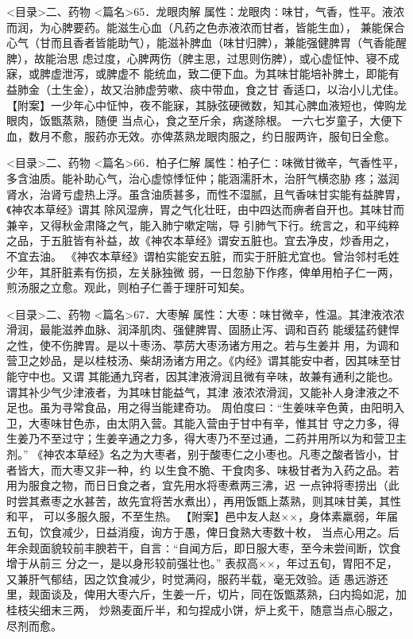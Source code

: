 \documentclass[a4paper,12pt,UTF8,twoside]{ctexbook}
\begin{document}
<目录>二、药物
<篇名>65．龙眼肉解
属性：龙眼肉∶味甘，气香，性平。液浓而润，为心脾要药。能滋生心血（凡药之色赤液浓而甘者，皆能生血）， 
兼能保合心气（甘而且香者皆能助气），能滋补脾血（味甘归脾），兼能强健脾胃（气香能醒脾），故能治思 
虑过度，心脾两伤（脾主思，过思则伤脾），或心虚怔忡、寝不成寐，或脾虚泄泻，或脾虚不 
能统血，致二便下血。为其味甘能培补脾土，即能有益肺金（土生金），故又治肺虚劳嗽、痰中带血，食之甘 
香适口，以治小儿尤佳。 
【附案】一少年心中怔忡，夜不能寐，其脉弦硬微数，知其心脾血液短也，俾购龙眼肉，饭甑蒸熟，随便 
当点心，食之至斤余，病遂除根。 
一六七岁童子，大便下血，数月不愈，服药亦无效。亦俾蒸熟龙眼肉服之，约日服两许，服旬日全愈。 

<目录>二、药物
<篇名>66．柏子仁解
属性：柏子仁∶味微甘微辛，气香性平，多含油质。能补助心气，治心虚惊悸怔仲；能涵濡肝木，治肝气横恣胁 
疼；滋润肾水，治肾亏虚热上浮。虽含油质甚多，而性不湿腻，且气香味甘实能有益脾胃，《神农本草经》谓其 
除风湿痹，胃之气化壮旺，由中四达而痹者自开也。其味甘而兼辛，又得秋金肃降之气，能入肺宁嗽定喘，导 
引肺气下行。统言之，和平纯粹之品，于五脏皆有补益，故《神农本草经》谓安五脏也。宜去净皮，炒香用之， 
不宜去油。 
《神农本草经》谓柏实能安五脏，而实于肝脏尤宜也。曾治邻村毛姓少年，其肝脏素有伤损，左关脉独微 
弱，一日忽胁下作疼，俾单用柏子仁一两，煎汤服之立愈。观此，则柏子仁善于理肝可知矣。 

<目录>二、药物
<篇名>67．大枣解
属性：大枣∶味甘微辛，性温。其津液浓浓滑润，最能滋养血脉、润泽肌肉、强健脾胃、固肠止泻、调和百药 
能缓猛药健悍之性，使不伤脾胃。是以十枣汤、葶苈大枣汤诸方用之。若与生姜并 
用，为调和营卫之妙品，是以桂枝汤、柴胡汤诸方用之。《内经》谓其能安中者，因其味至甘能守中也。又谓 
其能通九窍者，因其津液滑润且微有辛味，故兼有通利之能也。谓其补少气少津液者，为其味甘能益气，其津 
液浓浓滑润，又能补人身津液之不足也。虽为寻常食品，用之得当能建奇功。 
周伯度曰∶“生姜味辛色黄，由阳明入卫，大枣味甘色赤，由太阴入营。其能入营由于甘中有辛，惟其甘 
守之力多，得生姜乃不至过守；生姜辛通之力多，得大枣乃不至过通，二药并用所以为和营卫主剂。” 
《神农本草经》名之为大枣者，别于酸枣仁之小枣也。凡枣之酸者皆小，甘者皆大，而大枣又非一种，约 
以生食不脆、干食肉多、味极甘者为入药之品。若用为服食之物，而日日食之者，宜先用水将枣煮两三沸，迟 
一点钟将枣捞出（此时尝其煮枣之水甚苦，故先宜将苦水煮出），再用饭甑上蒸熟，则其味甘美，其性和平， 
可以多服久服，不至生热。 
【附案】邑中友人赵××，身体素羸弱，年届五旬，饮食减少，日益消瘦，询方于愚，俾日食熟大枣数十枚， 
当点心用之。后年余觌面貌较前丰腴若干，自言∶“自闻方后，即日服大枣，至今未尝间断，饮食增于从前三 
分之一，是以身形较前强壮也。” 
表叔高××，年过五旬，胃阳不足，又兼肝气郁结，因之饮食减少，时觉满闷，服药半载，毫无效验。适 
愚远游还里，觌面谈及，俾用大枣六斤，生姜一斤，切片，同在饭甑蒸熟，臼内捣如泥，加桂枝尖细末三两， 
炒熟麦面斤半，和匀捏成小饼，炉上炙干，随意当点心服之，尽剂而愈。 
\end{document}
